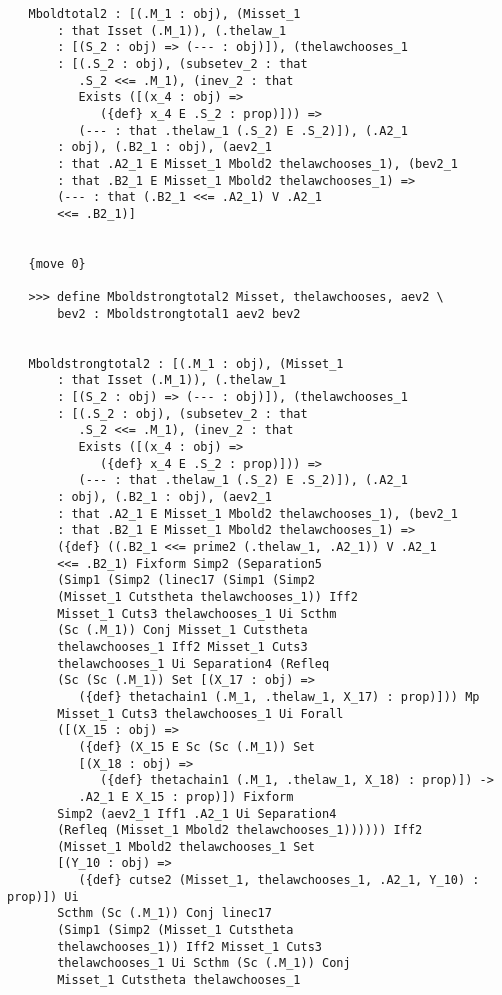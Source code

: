 \documentclass[12pt]{article}
\begin{document}
\begin{verbatim}
   Mboldtotal2 : [(.M_1 : obj), (Misset_1 
       : that Isset (.M_1)), (.thelaw_1 
       : [(S_2 : obj) => (--- : obj)]), (thelawchooses_1 
       : [(.S_2 : obj), (subsetev_2 : that 
          .S_2 <<= .M_1), (inev_2 : that 
          Exists ([(x_4 : obj) => 
             ({def} x_4 E .S_2 : prop)])) => 
          (--- : that .thelaw_1 (.S_2) E .S_2)]), (.A2_1 
       : obj), (.B2_1 : obj), (aev2_1 
       : that .A2_1 E Misset_1 Mbold2 thelawchooses_1), (bev2_1 
       : that .B2_1 E Misset_1 Mbold2 thelawchooses_1) => 
       (--- : that (.B2_1 <<= .A2_1) V .A2_1 
       <<= .B2_1)]


   {move 0}

   >>> define Mboldstrongtotal2 Misset, thelawchooses, aev2 \
       bev2 : Mboldstrongtotal1 aev2 bev2


   Mboldstrongtotal2 : [(.M_1 : obj), (Misset_1 
       : that Isset (.M_1)), (.thelaw_1 
       : [(S_2 : obj) => (--- : obj)]), (thelawchooses_1 
       : [(.S_2 : obj), (subsetev_2 : that 
          .S_2 <<= .M_1), (inev_2 : that 
          Exists ([(x_4 : obj) => 
             ({def} x_4 E .S_2 : prop)])) => 
          (--- : that .thelaw_1 (.S_2) E .S_2)]), (.A2_1 
       : obj), (.B2_1 : obj), (aev2_1 
       : that .A2_1 E Misset_1 Mbold2 thelawchooses_1), (bev2_1 
       : that .B2_1 E Misset_1 Mbold2 thelawchooses_1) => 
       ({def} ((.B2_1 <<= prime2 (.thelaw_1, .A2_1)) V .A2_1 
       <<= .B2_1) Fixform Simp2 (Separation5 
       (Simp1 (Simp2 (linec17 (Simp1 (Simp2 
       (Misset_1 Cutstheta thelawchooses_1)) Iff2 
       Misset_1 Cuts3 thelawchooses_1 Ui Scthm 
       (Sc (.M_1)) Conj Misset_1 Cutstheta 
       thelawchooses_1 Iff2 Misset_1 Cuts3 
       thelawchooses_1 Ui Separation4 (Refleq 
       (Sc (Sc (.M_1)) Set [(X_17 : obj) => 
          ({def} thetachain1 (.M_1, .thelaw_1, X_17) : prop)])) Mp 
       Misset_1 Cuts3 thelawchooses_1 Ui Forall 
       ([(X_15 : obj) => 
          ({def} (X_15 E Sc (Sc (.M_1)) Set 
          [(X_18 : obj) => 
             ({def} thetachain1 (.M_1, .thelaw_1, X_18) : prop)]) -> 
          .A2_1 E X_15 : prop)]) Fixform 
       Simp2 (aev2_1 Iff1 .A2_1 Ui Separation4 
       (Refleq (Misset_1 Mbold2 thelawchooses_1)))))) Iff2 
       (Misset_1 Mbold2 thelawchooses_1 Set 
       [(Y_10 : obj) => 
          ({def} cutse2 (Misset_1, thelawchooses_1, .A2_1, Y_10) : prop)]) Ui 
       Scthm (Sc (.M_1)) Conj linec17 
       (Simp1 (Simp2 (Misset_1 Cutstheta 
       thelawchooses_1)) Iff2 Misset_1 Cuts3 
       thelawchooses_1 Ui Scthm (Sc (.M_1)) Conj 
       Misset_1 Cutstheta thelawchooses_1 

\end{verbatim}
\end{document}
